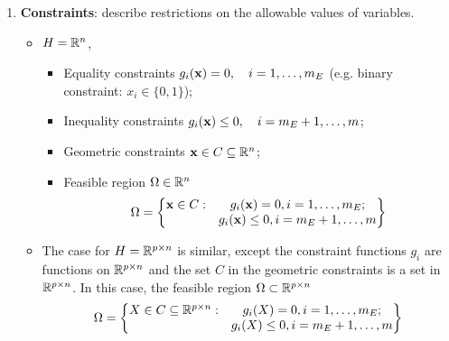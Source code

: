 \begin{enumerate}[label=(\arabic*)]
\begin{itemize}
              \item \(H = \bR^{p \times n}\), the decision variable is an \((p \times n)\) matrix \(X\) and objective function \(f: \bR^{p \times n} \to \bR\). For example,
                    \begin{itemize}
                        \item \(f(X) = \sum_{i=1}^p\sum_{j=1}^n A_{ij}X_{ij}\), where \(A\) is given \((p \times n)\) matrix \(X\);
                        \item \(f(X) = \rank(X)\), where \(\rank(X)\) is the rank of a matrix \(X\).
                    \end{itemize}
          \end{itemize}
    \item \textbf{Constraints}: describe restrictions on the allowable values of variables.
          \begin{itemize}
              \item \(H = \mathbb{R}^n\),
                    \begin{itemize}
                        \item Equality constraints \(g_i(\mathbf{x}) = 0, \quad i = 1, \dots, m_E\) (e.g. binary constraint: \(x_i \in \{0, 1\}\));
                        \item Inequality constraints \(g_i(\mathbf{x}) \leq 0, \quad i = m_E + 1, \dots, m\);
                        \item Geometric constraints \(\mathbf{x} \in C \subseteq \mathbb{R}^n\);
                        \item Feasible region \(\Omega \in \mathbb{R}^n\)
                              \[\Omega = \begin{Bmatrix}
                                      \mathbf{x} \in C : & g_i(\mathbf{x}) = 0, i = 1, \dots, m_E;       \\
                                                  & g_i(\mathbf{x}) \leq 0, i = m_E + 1, \dots, m
                                  \end{Bmatrix}\]
                    \end{itemize}
              \item The case for \(H = \bR^{p \times n}\) is similar, except the constraint functions \(g_i\) are functions on \(\mathbb{R}^{p \times n}\) and the set \(C\) in the geometric constraints is a set in \(\mathbb{R}^{p \times n}\). In this case, the feasible region \(\Omega \subset \mathbb{R}^{p \times n}\)
                    \[\Omega = \begin{Bmatrix} X \in C \subseteq \mathbb{R}^{p \times n} : & g_i(X) = 0, i = 1, \dots, m_E; \\ &g_i(X) \leq 0, i = m_E + 1, \dots, m \end{Bmatrix}\]
          \end{itemize}
\end{enumerate}

